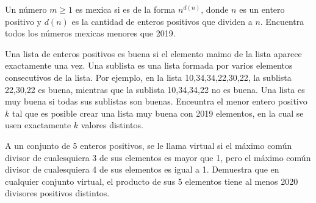 \documentclass[11pt]{scrartcl}
\begin{document}
\begin{problem}
[2019/1] Un número $m \geq 1$ es mexica si es de la forma $n^{d(n)}$, donde $n$ es un entero positivo y $d(n)$ es la cantidad de enteros positivos que dividen a $n$. Encuentra todos los números mexicas menores que 2019.
\end{problem}

\begin{problem}
[2019/4] Una lista de enteros positivos es buena si el elemento maimo de la lista aparece exactamente una vez. Una sublista es una lista formada por varios elementos consecutivos de la lista. Por ejemplo, en la lista 10,34,34,22,30,22, la sublista 22,30,22 es buena, mientras que la sublista 10,34,34,22 no es buena. Una lista es muy buena si todas sus sublistas son buenas. Enceuntra el menor entero positivo $k$ tal que es posible crear una lista muy buena con 2019 elementos, en la cual se usen exactamente $k$ valores distintos.
\end{problem}

\begin{problem}
[2020/1]A un conjunto de 5 enteros positivos, se le llama virtual si el máximo común divisor de cualesquiera 3 de sus elementos es mayor que 1, pero el máximo común divisor de cualesquiera 4 de sus elementos es igual a 1. Demuestra que en cualquier conjunto virtual, el producto de sus 5 elementos tiene al menos 2020 divisores positivos distintos.
\end{problem}
\end{document}
